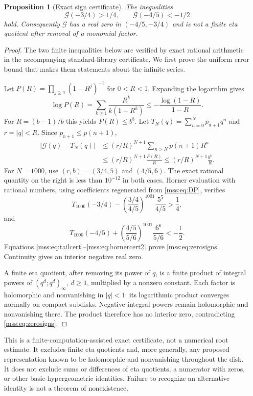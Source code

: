 \documentclass[11pt,letterpaper]{article}
\numberwithin{equation}{section}
\newtheorem{proposition}[theorem]{Proposition}
\theoremstyle{definition}\newtheorem{definition}[theorem]{Definition}
\theoremstyle{remark}\newtheorem{remark}[theorem]{Remark}
\begin{document}
\begin{proposition}[Exact sign certificate]\label{mss:prop:zero}
The inequalities
\begin{equation}\label{mss:eq:zerosigns}
\mathcal G(-3/4)>1/4,\qquad \mathcal G(-4/5)<-1/2
\end{equation}
hold. Consequently $\mathcal G$ has a real zero in $(-4/5,-3/4)$ and is not a finite eta quotient after removal of a monomial factor.
\end{proposition}
\begin{proof}
The two finite inequalities below are verified by exact rational arithmetic in the accompanying standard-library certificate. We first prove the uniform error bound that makes them statements about the infinite series.

Let $P(R)=\prod_{j\ge1}(1-R^j)^{-1}$ for $0<R<1$. Expanding the logarithm gives
\begin{equation}\label{mss:eq:partitionmajorant}
\log P(R)=\sum_{k\ge1}\frac{R^k}{k(1-R^k)}
\le-\frac{\log(1-R)}{1-R}.
\end{equation}
For $R=(b-1)/b$ this yields $P(R)\le b^b$. Let
$T_N(q)=\sum_{n=0}^Np_{n+1}q^n$ and $r=|q|<R$. Since $p_{n+1}\le p(n+1)$,
\begin{align}\label{mss:eq:tailcert}
|\mathcal G(q)-T_N(q)|
&\le(r/R)^{N+1}\sum_{n>N}p(n+1)R^n\\
&\le(r/R)^{N+1}\frac{P(R)}R
\le(r/R)^{N+1}\frac{b^b}{R}.\nonumber
\end{align}
For $N=1000$, use $(r,b)=(3/4,5)$ and $(4/5,6)$. The exact rational quantity on the right is less than $10^{-12}$ in both cases. Horner evaluation with rational numbers, using coefficients regenerated from \eqref{mss:eq:DP}, verifies
\begin{equation}\label{mss:eq:hornercert}
T_{1000}(-3/4)-\left(\frac{3/4}{4/5}\right)^{1001}\frac{5^5}{4/5}>\frac14,
\end{equation}
and
\begin{equation}\label{mss:eq:hornercert2}
T_{1000}(-4/5)+\left(\frac{4/5}{5/6}\right)^{1001}\frac{6^6}{5/6}<-\frac12.
\end{equation}
Equations \eqref{mss:eq:tailcert}--\eqref{mss:eq:hornercert2} prove \eqref{mss:eq:zerosigns}. Continuity gives an interior negative real zero.

A finite eta quotient, after removing its power of $q$, is a finite product of integral powers of $(q^d;q^d)_\infty$, $d\ge1$, multiplied by a nonzero constant. Each factor is holomorphic and nonvanishing in $|q|<1$: its logarithmic product converges normally on compact subdisks. Negative integral powers remain holomorphic and nonvanishing there. The product therefore has no interior zero, contradicting \eqref{mss:eq:zerosigns}.
\end{proof}
This is a finite-computation-assisted exact certificate, not a numerical root estimate. It excludes finite eta quotients and, more generally, any proposed representation known to be holomorphic and nonvanishing throughout the disk. It does not exclude sums or differences of eta quotients, a numerator with zeros, or other basic-hypergeometric identities. Failure to recognize an alternative identity is not a theorem of nonexistence.
\end{document}
